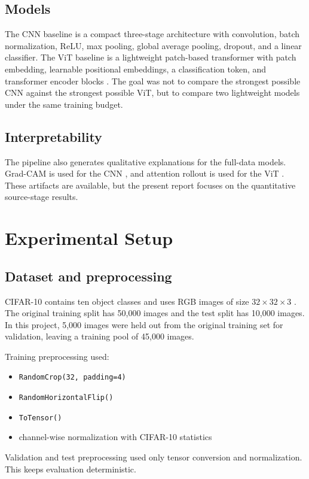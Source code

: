 \documentclass[11pt]{article}
\begin{document}
\subsection{Models}
The CNN baseline is a compact three-stage architecture with convolution, batch normalization, ReLU, max pooling, global average pooling, dropout, and a linear classifier. The ViT baseline is a lightweight patch-based transformer with patch embedding, learnable positional embeddings, a classification token, and transformer encoder blocks \cite{dosovitskiy2021image}. The goal was not to compare the strongest possible CNN against the strongest possible ViT, but to compare two lightweight models under the same training budget.

\subsection{Interpretability}
The pipeline also generates qualitative explanations for the full-data models. Grad-CAM is used for the CNN \cite{selvaraju2017grad}, and attention rollout is used for the ViT \cite{abnar2020quantifying}. These artifacts are available, but the present report focuses on the quantitative source-stage results.

\section{Experimental Setup}
\subsection{Dataset and preprocessing}
CIFAR-10 contains ten object classes and uses RGB images of size $32 \times 32 \times 3$ \cite{krizhevsky2009learning}. The original training split has 50{,}000 images and the test split has 10{,}000 images. In this project, 5{,}000 images were held out from the original training set for validation, leaving a training pool of 45{,}000 images.

Training preprocessing used:
\begin{itemize}
    \item \texttt{RandomCrop(32, padding=4)}
    \item \texttt{RandomHorizontalFlip()}
    \item \texttt{ToTensor()}
    \item channel-wise normalization with CIFAR-10 statistics
\end{itemize}

Validation and test preprocessing used only tensor conversion and normalization. This keeps evaluation deterministic.
\end{document}
